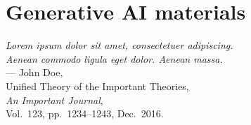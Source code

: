 

%
%


\chapter{Generative AI materials}
\label{ch:appendixThree}



\begin{flushright}
{\slshape Lorem ipsum dolor sit amet, consectetuer adipiscing.}\\
{\slshape Aenean commodo ligula eget dolor. Aenean massa.}\\
\medskip
--- John Doe,\\
Unified Theory of the Important Theories,\\
{\slshape An Important Journal},\\
Vol.~123, pp.~1234--1243, Dec.~2016.\\
\end{flushright}

\bigskip


